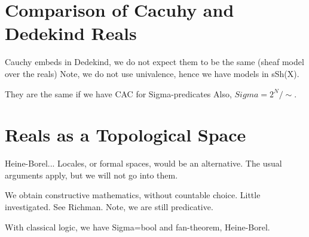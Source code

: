 \section{Comparison of Cacuhy and Dedekind Reals}
\label{sec:comp-cacuhy-dedek}

Cauchy embeds in Dedekind, we do not expect them to be the same (sheaf model over the
reals) Note, we do not use univalence, hence we have models in sSh(X).

They are the same if we have CAC for Sigma-predicates
Also, $Sigma = 2^N/\sim$.


\section{Reals as a Topological Space}
\label{sec:reals-as-topological}

Heine-Borel... Locales, or formal spaces, would be an alternative. The usual arguments
apply, but we will not go into them.

We obtain constructive mathematics, without countable choice. Little investigated.
See Richman. Note, we are still predicative.

With classical logic, we have Sigma=bool and fan-theorem, Heine-Borel.


